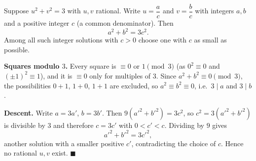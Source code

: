 Suppose $u^2+v^2=3$ with $u,v$ rational. Write $u=\dfrac {a}{c}$ and $v=\dfrac {b}{c}$ with integers $a,b$ and a positive integer $c$ (a common denominator). Then
\[
a^2+b^2=3c^2 .
\]
Among all such integer solutions with $c>0$ choose one with $c$ as small as possible.

\textbf{Squares modulo $3$.} Every square is $\equiv0$ or $1\pmod3$ (as $0^2\equiv0$ and $(\pm1)^2\equiv1$), and it is $\equiv0$ only for multiples of $3$. Since $a^2+b^2\equiv0\pmod3$, the possibilities $0+1$, $1+0$, $1+1$ are excluded, so $a^2\equiv b^2\equiv0$, i.e.\ $3\mid a$ and $3\mid b$.

\textbf{Descent.} Write $a=3a'$, $b=3b'$. Then $9(a'^2+b'^2)=3c^2$, so $c^2=3(a'^2+b'^2)$ is divisible by $3$ and therefore $c=3c'$ with $0<c'<c$. Dividing by $9$ gives
\[
a'^2+b'^2=3c'^2 ,
\]
another solution with a smaller positive $c'$, contradicting the choice of $c$. Hence no rational $u,v$ exist. $\blacksquare$
